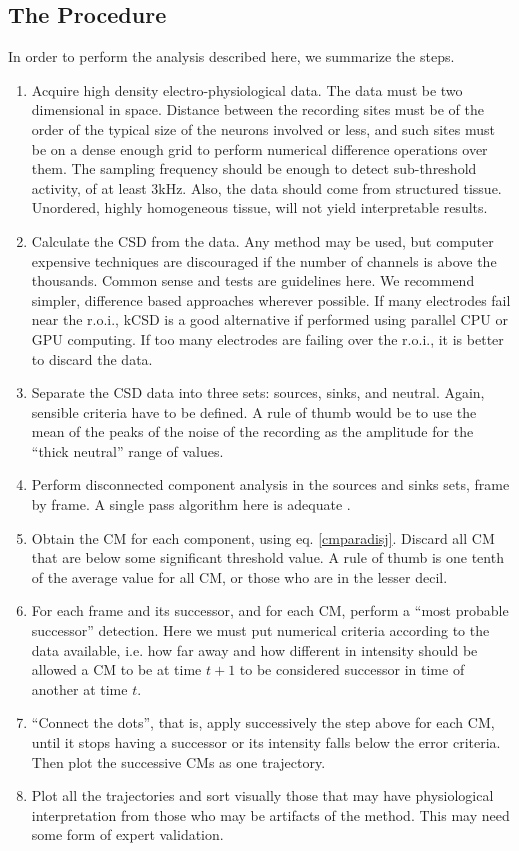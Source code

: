 \documentclass[11pt, letterpaper]{article}
\begin{document}
 \subsection{The Procedure}
 
 In order to perform the analysis described here, we summarize the steps.
 \begin{enumerate}
 \item Acquire high density electro-physiological data. The data must be two
   dimensional
   in space. Distance between the recording sites must be of the order of the typical
   size of the neurons involved or less, and such sites must be on a dense enough grid to perform numerical difference operations over them.
   The sampling frequency should be enough to detect sub-threshold activity,
   of at least 3kHz. Also, the data should come from structured tissue.
   Unordered, highly homogeneous tissue, will not yield interpretable results. 
 \item Calculate the CSD from the data. Any method may be used,
   but computer expensive techniques are discouraged if the
   number of channels is above the thousands.
   Common sense and tests are guidelines here.
   We recommend simpler, difference based approaches wherever possible.
   If many electrodes fail near the r.o.i.,
   kCSD is a good alternative if performed using
   parallel CPU or GPU computing.
   If too many electrodes are failing over the r.o.i.,
   it is better to discard the data. 
 \item Separate the CSD data into three sets: sources, sinks, and neutral.
   Again, sensible criteria have to be defined.
   A rule of thumb would be to use the mean of the peaks of the noise  of the recording as the amplitude for the ``thick neutral'' range of values. 
\item Perform disconnected component analysis in the sources and sinks sets, frame by frame.
  A single pass algorithm here is  adequate \cite{Vincent91, Abubaker07}.
\item  Obtain the CM for each component, using eq. \ref{cmparadisj}. Discard
  all CM that are below some significant threshold value. A rule of thumb is one tenth of the average value for all CM,
  or those who are in the lesser decil. 
\item For each frame and its successor, and for each CM, perform a ``most probable successor'' detection. Here we must put numerical criteria according to the data available, i.e. how far away and how different in intensity should be allowed a CM to be at time $t+1$ to be considered successor in time of another at time $t$.
\item ``Connect the dots'', that is, apply successively the step above for each CM, until it stops having a successor or its intensity falls below the error criteria. Then plot the successive CMs as one trajectory.
\item Plot all the trajectories and sort visually those that may have physiological interpretation from those who may be artifacts of the method. This may need some form of expert validation.
 \end{enumerate}
 
\end{document}
